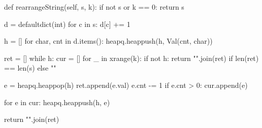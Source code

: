 \begin{python}
def rearrangeString(self, s, k):
  if not s or k == 0: return s

  d = defaultdict(int)
  for c in s:
    d[c] += 1

  h = []
  for char, cnt in d.items():
    heapq.heappush(h, Val(cnt, char))

  ret = []
  while h:
    cur = []
    for _ in xrange(k):
      if not h: 
        return "".join(ret) if len(ret) == len(s) else ""

      e = heapq.heappop(h)
      ret.append(e.val)
      e.cnt -= 1
      if e.cnt > 0:
        cur.append(e)

    for e in cur:
      heapq.heappush(h, e)

  return "".join(ret)

\end{python}


